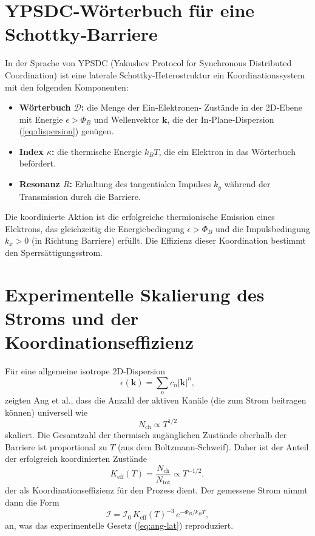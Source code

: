 \documentclass[12pt,a4paper]{article}
\newcommand{\Keff}{K_{\mathrm{eff}}}
\begin{document}
	\section{YPSDC‑Wörterbuch für eine Schottky‑Barriere}
	In der Sprache von YPSDC (Yakushev Protocol for Synchronous
	Distributed Coordination) ist eine laterale Schottky‑Heterostruktur ein
	Koordinationssystem mit den folgenden Komponenten:
	\begin{itemize}
		\item \textbf{Wörterbuch $\mathcal{D}$:} die Menge der Ein‑Elektronen‑
		Zustände in der 2D‑Ebene mit Energie $\epsilon > \Phi_B$ und
		Wellenvektor $\mathbf{k}$, die der In‑Plane‑Dispersion (\ref{eq:dispersion})
		genügen.
		\item \textbf{Index $\kappa$:} die thermische Energie $k_B T$, die ein
		Elektron in das Wörterbuch befördert.
		\item \textbf{Resonanz $R$:} Erhaltung des tangentialen Impulses
		$k_y$ während der Transmission durch die Barriere.
	\end{itemize}
	Die koordinierte Aktion ist die erfolgreiche thermionische Emission eines
	Elektrons, das gleichzeitig die Energiebedingung $\epsilon > \Phi_B$ und die
	Impulsbedingung $k_x > 0$ (in Richtung Barriere) erfüllt. Die Effizienz
	dieser Koordination bestimmt den Sperrsättigungsstrom.
	
	\section{Experimentelle Skalierung des Stroms und der Koordinationseffizienz}
	
	Für eine allgemeine isotrope 2D‑Dispersion
	\begin{equation}
		\epsilon(\mathbf{k}) = \sum_n c_n |\mathbf{k}|^n,
		\label{eq:dispersion}
	\end{equation}
	zeigten Ang et al., dass die Anzahl der aktiven Kanäle (die zum Strom
	beitragen können) universell wie
	\begin{equation}
		N_{\mathrm{ch}} \propto T^{1/2}
		\label{eq:Nch}
	\end{equation}
	skaliert. Die Gesamtzahl der thermisch zugänglichen Zustände oberhalb der
	Barriere ist proportional zu $T$ (aus dem Boltzmann‑Schweif). Daher ist der
	Anteil der erfolgreich koordinierten Zustände
	\begin{equation}
		\Keff(T) = \frac{N_{\mathrm{ch}}}{N_{\mathrm{tot}}} \propto T^{-1/2},
		\label{eq:keff-T}
	\end{equation}
	der als Koordinationseffizienz für den Prozess dient. Der gemessene Strom
	nimmt dann die Form
	\begin{equation}
		\mathcal{I} = \mathcal{I}_0 \, \Keff(T)^{-3} \, e^{-\Phi_B/k_B T},
		\label{eq:I-via-keff}
	\end{equation}
	an, was das experimentelle Gesetz (\ref{eq:ang-lat}) reproduziert.
	
\end{document}
